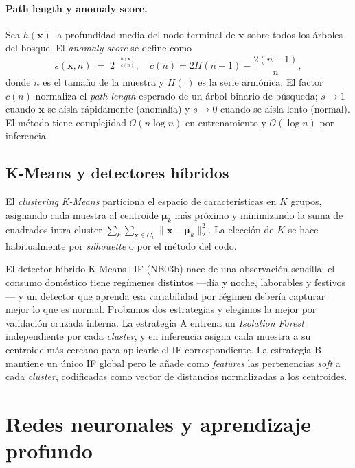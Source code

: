 \paragraph{Path length y anomaly score.} Sea $h(\bm{x})$ la profundidad media del nodo terminal de $\bm{x}$ sobre todos los árboles del bosque. El \emph{anomaly score} se define como
\begin{equation}
s(\bm{x}, n) \;=\; 2^{-\frac{h(\bm{x})}{c(n)}}, \quad c(n) = 2H(n-1) - \frac{2(n-1)}{n},
\label{eq:if-score}
\end{equation}
donde $n$ es el tamaño de la muestra y $H(\cdot)$ es la serie armónica. El factor $c(n)$ normaliza el \emph{path length} esperado de un árbol binario de búsqueda; $s \to 1$ cuando $\bm{x}$ se aísla rápidamente (anomalía) y $s \to 0$ cuando se aísla lento (normal). El método tiene complejidad $\mathcal{O}(n \log n)$ en entrenamiento y $\mathcal{O}(\log n)$ por inferencia.

\subsection{K-Means y detectores híbridos}

El \emph{clustering} \emph{K-Means} \cite{macqueen1967some} particiona el espacio de características en $K$ grupos, asignando cada muestra al centroide $\bm{\mu}_k$ más próximo y minimizando la suma de cuadrados intra-cluster $\sum_k \sum_{\bm{x} \in C_k} \|\bm{x} - \bm{\mu}_k\|_2^2$. La elección de $K$ se hace habitualmente por \emph{silhouette} \cite{rousseeuw1987silhouette} o por el método del codo.

El detector híbrido K-Means+IF (NB03b) nace de una observación sencilla: el consumo doméstico tiene regímenes distintos ---día y noche, laborables y festivos--- y un detector que aprenda esa variabilidad por régimen debería capturar mejor lo que es normal. Probamos dos estrategias y elegimos la mejor por validación cruzada interna. La estrategia A entrena un \textit{Isolation Forest} independiente por cada \textit{cluster}, y en inferencia asigna cada muestra a su centroide más cercano para aplicarle el IF correspondiente. La estrategia B mantiene un único IF global pero le añade como \textit{features} las pertenencias \textit{soft} a cada \textit{cluster}, codificadas como vector de distancias normalizadas a los centroides.

\section{Redes neuronales y aprendizaje profundo}
\label{sec:teo-dl}

